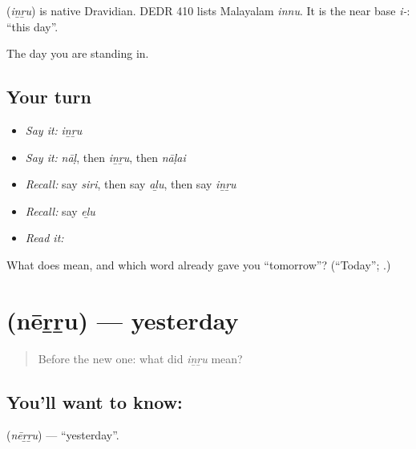 \begin{cousinweb}
\textbf{} (\emph{iṉṟu}) is native Dravidian. DEDR 410 lists Malayalam \emph{innu}. It is the near base \emph{i-}: \textquotedblleft{}this day\textquotedblright{}.
\end{cousinweb}

\begin{grammarlens}[title={What you've built}]
The day you are standing in.
\end{grammarlens}

\subsection*{Your turn}
\begin{itemize}
\raggedright
  \item \emph{Say it:} \emph{iṉṟu}
  \item \emph{Say it:} \emph{nāḷ}, then \emph{iṉṟu}, then \emph{nāḷai}
  \item \emph{Recall:} say \emph{siri}, then say \emph{aḻu}, then say \emph{iṉṟu}
  \item \emph{Recall:} say \emph{eḻu}
  \item \emph{Read it:} \textbf{}
\end{itemize}

\begin{tcolorbox}[breakable,colback=teal!4,colframe=teal!35!black,title={Before you move on}]
What does  mean, and which word already gave you \textquotedblleft{}tomorrow\textquotedblright{}? (\textquotedblleft{}Today\textquotedblright{}; \textbf{}.)
\end{tcolorbox}
\section[\texorpdfstring{\ta{நேற்று} (nēṟṟu)}{நேற்று (nēṟṟu)}]{ (nēṟṟu) — yesterday}

\label{lesson:TA-C73-yesterday}



\begin{quote}
Before the new one: what did \emph{iṉṟu} mean?
\end{quote}

\subsection*{You'll want to know: }
\textbf{} (\emph{nēṟṟu}) — \textquotedblleft{}yesterday\textquotedblright{}.


